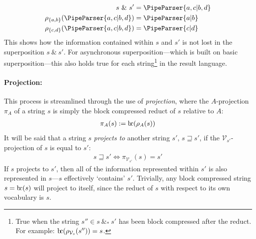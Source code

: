 \documentclass[a4paper,12pt,leqno,twoside]{article}
\newcommand{\bc}{{\rm b\!c}}
\newcommand{\vph}[1]{\vphantom{#1}}
\newcommand{\ebox}[1]{\fbox{$\vph{'(),}#1$}}
\renewcommand{\sp}{~\&~}
\newcommand{\spasync}{~\&_*~}
\newcommand{\V}{\mathcal{V}}
\newcommand{\EventString}[1]{%
	\renewcommand*{\do}[1]{\ebox{##1}}%
	\PipeParser{#1}%
}
\begin{document}
\begin{align}\label{ex:disjoint-vocab-reduct}
	s \sp s' &= \EventString{a,c|b,d}\\
	\rho_{\{a,b\}}(\EventString{a,c|b,d}) &= \EventString{a|b}\notag\\
	\rho_{\{c,d\}}(\EventString{a,c|b,d}) &= \EventString{c|d}\notag
\end{align}
This shows how the information contained within $s$ and $s'$ is not lost in the superposition $s \sp s'$. For asynchronous superposition---which is built on basic superposition---this also holds true for each string\footnote{True when the string $s'' \in s \spasync s'$ has been block compressed after the reduct. For example: $\bc(\rho_{\V_s}(s'')) = s$.} in the result language.
\paragraph{Projection:}\label{para:str-op-projection}
This process is streamlined through the use of \textit{projection}, where the $A$-projection $\pi_A$ of a string $s$ is simply the block compressed reduct of $s$ relative to $A$:
\begin{align}
	\pi_A(s) := \bc(\rho_A(s))
\end{align}
It will be said that a string $s$ \textit{projects to} another string $s'$, $s \sqsupseteq s'$, if the $\V_{s'}$-projection of $s$ is equal to $s'$:
\begin{align}
	s \sqsupseteq s' \Longleftrightarrow  \pi_{\V_{s'}}(s) = s'\label{def:projection}
\end{align}
If $s$ projects to $s'$, then all of the information represented within $s'$ is also represented in $s$---$s$ effectively `contains' $s'$. Trivially, any block compressed string $s = \bc(s)$ will project to itself, since the reduct of $s$ with respect to its own vocabulary is $s$.
\end{document}
